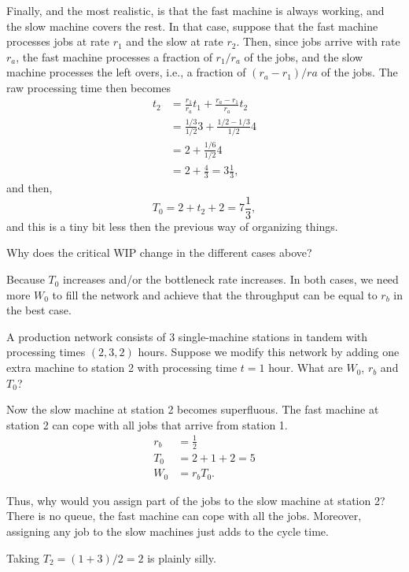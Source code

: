 \begin{question}
\begin{solution}
    Finally, and the most realistic, is that the fast machine is
    always working, and the slow machine covers the rest.  In that
    case, suppose that the fast machine processes jobs at rate $r_1$
    and the slow at rate $r_2$. Then, since jobs arrive with rate
    $r_a$, the fast machine processes a fraction of $r_1/r_a$ of the
    jobs, and the slow machine processes the left overs, i.e., a
    fraction of $(r_a-r_1)/ra$ of the jobs. The raw processing time then becomes
    \begin{equation*}
      \begin{split}
      t_2 
&= \frac{r_1}{r_a} t_1 + \frac{r_a-r_1}{r_a} t_2 \\
&= \frac{1/3}{1/2} 3 + \frac{1/2-1/3}{1/2} 4 \\
&= 2 + \frac{1/6}{1/2} 4 \\
&= 2 + \frac{4}{3} = 3\frac13,
      \end{split}
    \end{equation*}
and then,
\begin{equation*}
  T_0 = 2 + t_2 + 2 = 7\frac13,
\end{equation*}
and this is a tiny bit less then the previous way of organizing things. 

\end{solution}
\end{question}


\begin{question}
Why does the critical WIP change in the different cases above? 
\end{question}
\begin{solution}
  Because $T_0$ increases and/or the bottleneck rate increases. In
  both cases, we need more $W_0$ to fill the network and achieve that
  the throughput can be equal to $r_b$ in the best case.

\end{solution}

\begin{question}
  A production network consists of 3 single-machine stations in tandem
  with processing times $(2, 3, 2)$ hours.  Suppose we modify this
  network by adding one extra machine to station 2 with 
  processing time $t=1$ hour.  What are $W_0$, $r_b$ and $T_0$?
\end{question}
\begin{solution}
  Now the slow machine at station 2 becomes superfluous. The fast
  machine at station 2 can cope with all jobs that arrive from station
  1.
    \begin{align*}
      r_b &= \frac12 \\
      T_0 &= 2 + 1 + 2 = 5\\
      W_0 &= r_b T_0.
    \end{align*}

    Thus, why would you assign part of the jobs to the slow machine at
    station 2? There is no queue, the fast machine can cope with all
    the jobs. Moreover, assigning any job to the slow machines just
    adds to the cycle time.

Taking  $T_2=(1+3)/2=2$ is plainly silly. 
\end{solution}

